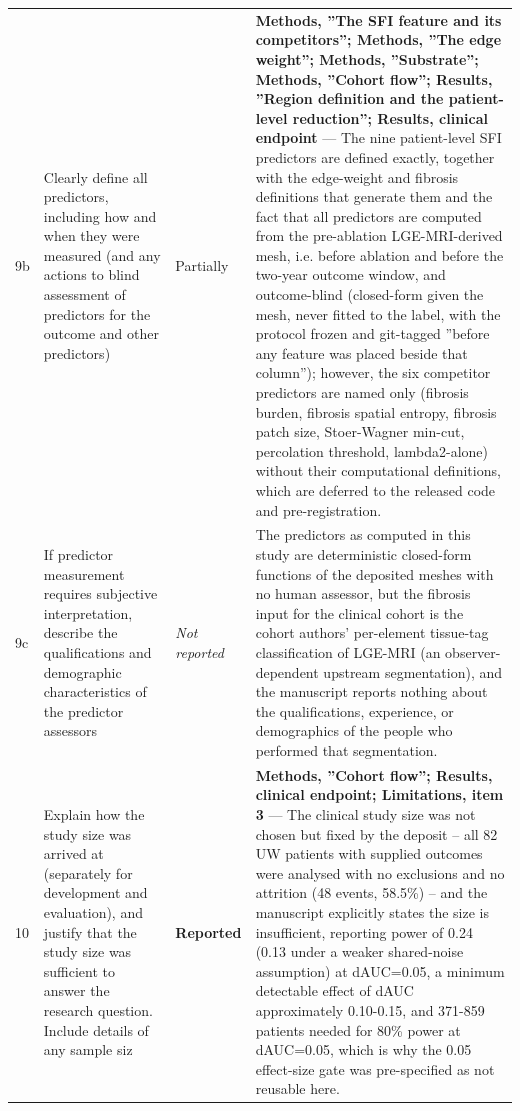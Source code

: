 \documentclass[10pt]{article}
\begin{document}
\begin{longtable}{@{}p{0.9cm} p{6.2cm} p{1.9cm} p{12.4cm}@{}}
9b & Clearly define all predictors, including how and when they were measured (and any actions to blind assessment of predictors for the outcome and other predictors) & Partially & \textbf{Methods, ''The SFI feature and its competitors''; Methods, ''The edge weight''; Methods, ''Substrate''; Methods, ''Cohort flow''; Results, ''Region definition and the patient-level reduction''; Results, clinical endpoint} --- The nine patient-level SFI predictors are defined exactly, together with the edge-weight and fibrosis definitions that generate them and the fact that all predictors are computed from the pre-ablation LGE-MRI-derived mesh, i.e. before ablation and before the two-year outcome window, and outcome-blind (closed-form given the mesh, never fitted to the label, with the protocol frozen and git-tagged ''before any feature was placed beside that column''); however, the six competitor predictors are named only (fibrosis burden, fibrosis spatial entropy, fibrosis patch size, Stoer-Wagner min-cut, percolation threshold, lambda2-alone) without their computational definitions, which are deferred to the released code and pre-registration. \\[2pt]
9c & If predictor measurement requires subjective interpretation, describe the qualifications and demographic characteristics of the predictor assessors & \emph{Not reported} & The predictors as computed in this study are deterministic closed-form functions of the deposited meshes with no human assessor, but the fibrosis input for the clinical cohort is the cohort authors' per-element tissue-tag classification of LGE-MRI (an observer-dependent upstream segmentation), and the manuscript reports nothing about the qualifications, experience, or demographics of the people who performed that segmentation. \\[2pt]
10 & Explain how the study size was arrived at (separately for development and evaluation), and justify that the study size was sufficient to answer the research question. Include details of any sample siz & \textbf{Reported} & \textbf{Methods, ''Cohort flow''; Results, clinical endpoint; Limitations, item 3} --- The clinical study size was not chosen but fixed by the deposit -- all 82 UW patients with supplied outcomes were analysed with no exclusions and no attrition (48 events, 58.5\%) -- and the manuscript explicitly states the size is insufficient, reporting power of 0.24 (0.13 under a weaker shared-noise assumption) at dAUC=0.05, a minimum detectable effect of dAUC approximately 0.10-0.15, and 371-859 patients needed for 80\% power at dAUC=0.05, which is why the 0.05 effect-size gate was pre-specified as not reusable here. \\[2pt]

\end{longtable}
\end{document}
